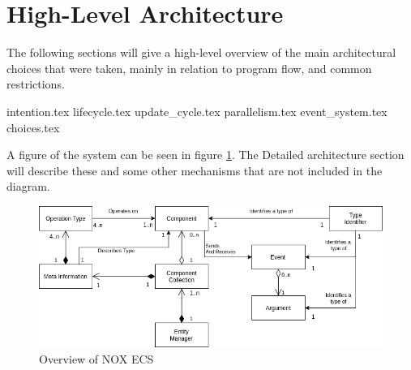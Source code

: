 \section{High-Level Architecture}
The following sections will give a high-level overview of the main architectural
choices that were taken, mainly in relation to program flow, and common restrictions.

{intention.tex}
{lifecycle.tex}
{update_cycle.tex}
{parallelism.tex}
{event_system.tex}
{choices.tex}

A figure of the system can be seen in figure \ref{fig:nox_ecs_uml}.
The Detailed architecture section will describe these and some other mechanisms that are not included
in the diagram.

\begin{figure}[tbp]
    \begin{center}
    \includegraphics[scale=0.45]{images/nox_ecs_uml.png}
    \caption{Overview of NOX ECS}
    \label{fig:nox_ecs_uml}
    \end{center}
\end{figure}
